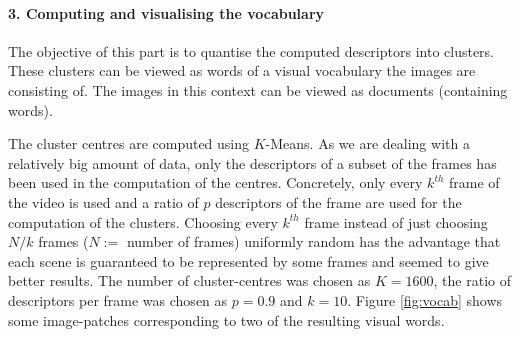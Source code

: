 \documentclass{paper}
\begin{document}
\paragraph{3. Computing and visualising the vocabulary}
The objective of this part is to quantise the computed descriptors into clusters. These clusters can be viewed as words of  a visual vocabulary the images are consisting of. The images in this context can be viewed as documents (containing words). 

The cluster centres are computed using $K$-Means. As we are dealing with a relatively big amount of data, only the descriptors of a subset of the frames has been used in the computation of the centres. Concretely, only every $k^{th}$ frame of the video is used and a ratio of $p$ descriptors of the frame are used for the computation of the clusters. Choosing every $k^{th}$ frame instead of just choosing $N/k$ frames ($N:=$ number of frames) uniformly random has the advantage that each scene is guaranteed to be represented by some frames and seemed to give better results. The number of cluster-centres  was chosen as $K=1600$, the ratio of descriptors per frame was chosen as $p=0.9$ and $k=10$. Figure \ref{fig:vocab} shows some image-patches corresponding to two of the resulting visual words.
\end{document}
